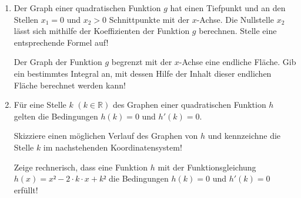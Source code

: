 \begin{langesbeispiel}
\begin{enumerate}
	\item Der Graph einer quadratischen Funktion $g$ hat einen Tiefpunkt und an den Stellen $x_1=0$ und $x_2>0$ Schnittpunkte mit der $x$-Achse. Die Nullstelle $x_2$ lässt sich mithilfe der Koeffizienten der Funktion $g$ berechnen. Stelle eine entsprechende Formel auf!\leer
	
	Der Graph der Funktion $g$ begrenzt mit der $x$-Achse eine endliche Fläche. Gib ein bestimmtes Integral an, mit dessen Hilfe der Inhalt dieser endlichen Fläche berechnet werden kann!\leer
	
	\item Für eine Stelle $k$ $(k\in\mathbb{R})$ des Graphen einer quadratischen Funktion $h$ gelten die Bedingungen $h(k)=0$ und $h'(k)=0$.
	
	 Skizziere einen möglichen Verlauf des Graphen von $h$ und kennzeichne die Stelle $k$ im nachstehenden Koordinatensystem!
	
	\begin{center}
	\end{center}
	
	Zeige rechnerisch, dass eine Funktion $h$ mit der Funktionsgleichung \mbox{$h(x)=x²-2\cdot k\cdot x+k²$} die Bedingungen $h(k)=0$ und $h'(k)=0$ erfüllt!
	
	
\end{enumerate}

\end{langesbeispiel}
